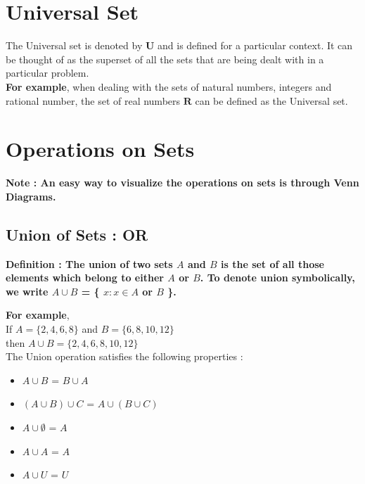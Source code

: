 \documentclass[12pt, letterpaper]{article}
\begin{document}
\section{Universal Set}
The Universal set is denoted by $\mathbf{U}$ and is defined for a particular context. It can be thought of as the superset of all the sets that are being dealt with in a particular problem.\\
\textbf{For example}, when dealing with the sets of natural numbers, integers and rational number, the set of real numbers $\mathbf{R}$ can be defined as the Universal set.


\section{Operations on Sets}
\textbf{Note : An easy way to visualize the operations on sets is through Venn Diagrams.}

\subsection{Union of Sets : OR}
\begin{displayquote}
\textbf{Definition : The union of two sets $A$ and $B$ is the set of all those elements which belong to either $A$ or $B$. To denote union symbolically, we write $A \cup B$ = \{ $x : x \in A$ or $B$ \}.}
\end{displayquote}
\textbf{For example},\\ 
If $A = \{2,4,6,8\}$ and $B = \{6,8,10,12\}$ \\
then $A \cup B = \{2,4,6,8,10,12\}$\\
The Union operation satisfies the following properties : 
\begin{itemize}
    \item $A \cup B$ = $B \cup A$
    \item $(A \cup B) \cup C$ = $A \cup (B \cup C)$
    \item $A \cup \emptyset$ = $A$ 
    \item $A \cup A$ = $A$
    \item $A \cup U$ = $U$
\end{itemize}
\end{document}
